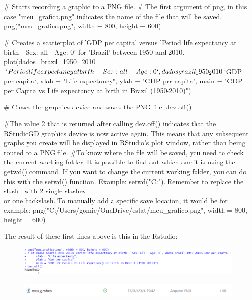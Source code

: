 \documentclass{article}
\begin{document}
\begin{spverbatim}

# Starts recording a graphic to a PNG file.
# The first argument of png, in this case "meu_grafico.png" indicates the name of the file that will be saved.
png("meu_grafico.png", width = 800, height = 600)

# Creates a scatterplot of 'GDP per capita' versus 'Period life expectancy at birth - Sex: all - Age: 0' for 'Brazil' between 1950 and 2010.
plot(dados_brazil_1950_2010$`Period life expectancy at birth - Sex: all - Age: 0`, dados_brazil_1950_2010$`GDP per capita`,
     xlab = "Life expectancy",
     ylab = "GDP per capita",
     main = "GDP per Capita vs Life expectancy at birth in Brazil (1950-2010)")

# Closes the graphics device and saves the PNG file.
dev.off()

#The value 2 that is returned after calling dev.off() indicates that the RStudioGD graphics device is now active again. This means that any subsequent graphs you create will be displayed in RStudio's plot window, rather than being routed to a PNG file.
#To know where the file will be saved, you need to check the current working folder. It is possible to find out which one it is using the getwd() command.
If you want to change the current working folder, you can do this with the setwd() function.
Example: setwd("C:\Users\gomie\OneDrive\estat"). Remember to replace the slash \ with 2 single slashes \\ or one backslash.
To manually add a specific save location, it would be for example: png("C:/Users/gomie/OneDrive/estat/meu_grafico.png", width = 800, height = 600)
\end{spverbatim}
The result of these first lines above is this in the Rstudio:
\begin{figure}[H]
    \centering
    \includegraphics[width=1\linewidth]{imagesfolder/image16.png}
\end{figure}
\begin{figure}[H]
    \centering
    \includegraphics[width=1\linewidth]{imagesfolder/image17.png}
\end{figure}
\end{document}
